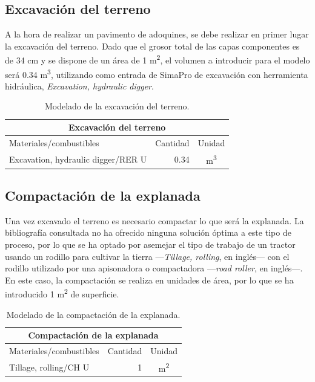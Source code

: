 \subsection{Excavación del terreno}

A la hora de realizar un pavimento de adoquines, se debe realizar en primer lugar la excavación del terreno. Dado que el grosor total de las capas componentes es de 34 \si{cm} y se dispone de un área de 1 \si{m^2}, el volumen a introducir para el modelo será 0.34 \si{m^3}, utilizando como entrada de SimaPro de excavación con herramienta hidráulica, \textit{Excavation, hydraulic digger}.

\begin{table}[!htb]
\centering
\begin{tabular}{p{8cm}rc}
\toprule
\multicolumn{3}{c}{Excavación del terreno}\\
\midrule
Materiales/combustibles & Cantidad & Unidad\\
\midrule
Excavation, hydraulic digger/RER U & 0.34 & \si{m^3}\\
\bottomrule
\end{tabular}
\caption{Modelado de la excavación del terreno.}
\label{modeladoexcavacion}
\end{table}

\subsection{Compactación de la explanada}

Una vez excavado el terreno es necesario compactar lo que será la explanada. La bibliografía consultada no ha ofrecido ninguna solución óptima a este tipo de proceso, por lo que se ha optado por asemejar el tipo de trabajo de un tractor usando un rodillo para cultivar la tierra —\textit{Tillage, rolling}, en inglés— con el rodillo utilizado por una apisonadora o compactadora —\textit{road roller}, en inglés—. En este caso, la compactación se realiza en unidades de área, por lo que se ha introducido 1 \si{m^2} de superficie.

\begin{table}[!htb]
\centering
\begin{tabular}{p{8cm}rc}
\toprule
\multicolumn{3}{c}{Compactación de la explanada}\\
\midrule
Materiales/combustibles & Cantidad & Unidad\\
\midrule
Tillage, rolling/CH U & 1 & \si{m^2}\\
\bottomrule
\end{tabular}
\caption{Modelado de la compactación de la explanada.}
\label{modeladoexplanada}
\end{table}

